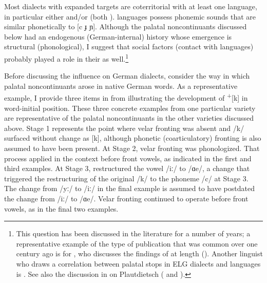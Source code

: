 Most dialects with expanded targets are coterritorial with at least one  language, in particular either  and/or  (both ).  languages possess phonemic sounds that are similar phonetically to [c ɟ ɲ]. Although the palatal noncontinuants discussed below had an endogenous (German-internal) history whose emergence is structural (phonological), I suggest that social factors (contact with  languages) probably played a role in their  as well.\footnote{{This question has been discussed in the literature for a number of years; a representative example of the type of publication that was common over one century ago is \citet{Gréb1921} for , who discusses the findings of \citet{Semrau1915a, Semrau1915b} at length (). Another linguist who draws a correlation between palatal stops in ELG dialects and  languages is \citet[120--124]{Mitzka1959}. See also the discussion in \citet[92--98]{Siemens2012} on Plautdietsch ( and ).} }

Before discussing the  influence on German dialects, consider the way in which palatal noncontinuants arose in native German words. As a representative example, I provide three items in  from  illustrating the development of  \textsuperscript{+}[k] in word-initial position. These three concrete examples from one particular variety are representative of the palatal noncontinuants in the other varieties discussed above. Stage 1 represents the point where velar fronting was absent and /k/ surfaced without change as [k], although phonetic (coarticulatory) fronting is also assumed to have been present. At Stage 2, velar fronting was phonologized. That process applied in the context before front vowels, as indicated in the first and third examples. At Stage 3,  restructured the vowel /iː/ to /ɑe/, a change that triggered the restructuring of the original /k/ to the phoneme /c/ at Stage 3. The change from /yː/ to /iː/ in the final example is assumed to have postdated the change from /iː/ to /ɑe/. Velar fronting continued to operate before front vowels, as in the final two examples.

